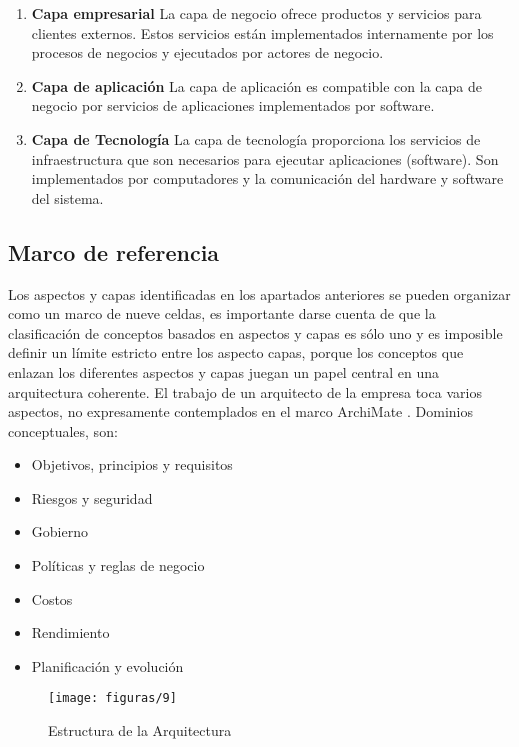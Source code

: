   \begin{enumerate}
  	\item \textbf{Capa empresarial} La capa de negocio ofrece productos y servicios para clientes externos. Estos servicios están implementados internamente por los procesos de negocios y ejecutados por actores de negocio.
  	\item \textbf{Capa de aplicación} La capa de aplicación es compatible con la capa de negocio por servicios de aplicaciones implementados por software.
  	\item \textbf{Capa de Tecnología} La capa de tecnología proporciona los servicios de infraestructura que son necesarios para ejecutar aplicaciones (software). Son implementados por computadores y la comunicación del hardware y software del sistema.
  \end{enumerate}
  
  \subsection{Marco de referencia}
Los aspectos y capas identificadas en los apartados anteriores se pueden organizar como un marco de nueve celdas, es importante darse cuenta de que la clasificación de conceptos basados en aspectos y capas es sólo uno y es imposible definir un límite estricto entre los aspecto capas, porque los conceptos que enlazan los diferentes aspectos y capas juegan un papel central en una arquitectura coherente. El trabajo de un arquitecto de la empresa toca varios aspectos, no expresamente contemplados en el marco ArchiMate \cite{ref9}. Dominios conceptuales, son:
  \begin{itemize}
  	\item Objetivos, principios y requisitos
  	\item Riesgos y seguridad
  	\item Gobierno
  	\item Políticas y reglas de negocio
  	\item Costos
  	\item Rendimiento
  	\item Planificación y evolución
  \end{itemize}
  
  \begin{figure}[H]
   	\centering
   	\texttt{[image: figuras/9]}
   	\captionsetup{width=.95\textwidth}
   	\caption{Estructura de la Arquitectura}
   	\label{figura9}
  \end{figure}

